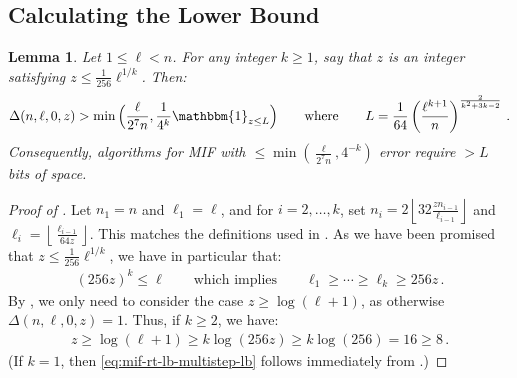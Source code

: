 \documentclass[10pt,a4paper]{article}
\newtheorem{lemma}[theorem]{Lemma}
\theoremstyle{definition}
\theoremstyle{remark}
\newcommand{\indic}{\mathbbm{1}}
\newcommand{\floor}[1]{{\left\lfloor{#1}\right\rfloor}}
\newcommand{\rl}{\mathbf{\ell}}             %
\newcommand{\Mstk}{\Delta}                  %
\begin{document}
\begin{itemize}
\begin{itemize}
\subsection{Calculating the Lower Bound}

\begin{lemma}\label{lem:mif-rt-lb-induct}
  Let $1 \le \rl < n$. For any integer $k \ge 1$, say that $z$ is an integer satisfying $z \le \frac{1}{256} \rl^{1 / k}$. Then:
  \begin{align}
    \Mstk(n,\rl,0,z) > \min\Big(\frac{\rl}{2^{7} n}, \frac{1}{4^{k}} \indic_{z \le L}\Big) \qquad \text{where} \qquad L = \frac{1}{64} \left(\frac{\rl^{k + 1}}{n}\right)^{\frac{2}{k^2 + 3 k - 2}} \,. \label{eq:mif-rt-lb-multistep-lb}
  \end{align}
  Consequently, algorithms for MIF with $\le \min(\frac{\rl}{2^{7} n}, 4^{-k})$ error require $> L$ bits of space.
\end{lemma}

\begin{proof}[Proof of ]
  Let $n_1 = n$ and $\rl_1 = \rl$, and for $i=2,\ldots,k$, set $n_i = 2\floor{32 \frac{z n_{i-1}}{\rl_{i-1}}}$ and $\rl_i = \floor{\frac{\rl_{i-1}}{64 z}}$. This matches the definitions used in . As we have been promised that $z \le \frac{1}{256} \rl^{1 / k}$, we have in particular that:
  \begin{align*}
    (256 z)^{k} \le \rl \qquad \text{which implies} \qquad \rl_1 \ge \cdots \ge \rl_k \ge 256 z \,.
  \end{align*}
  By , we only need to consider the case $z \ge \log(\rl+1)$, as otherwise $\Mstk(n,\rl,0,z) = 1$. Thus, if $k \ge 2$, we have:
  \begin{align*}
    z \ge \log(\rl+1) \ge k \log(256 z) \ge k \log(256) = 16 \ge 8 \,.
  \end{align*}
  (If $k=1$, then \cref{eq:mif-rt-lb-multistep-lb} follows immediately from .)


\end{proof}
\end{itemize}
\end{itemize}
\end{document}
